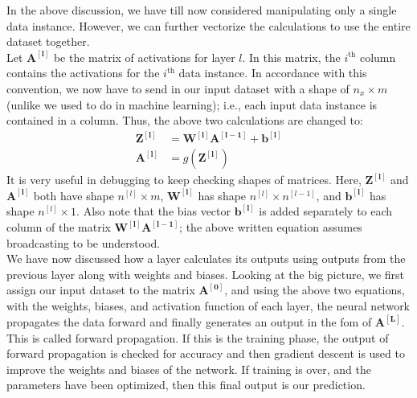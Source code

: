 \documentclass[a4paper, 12pt]{article}
\begin{document}
In the above discussion, we have till now considered manipulating only a single data instance. However, we can further vectorize the calculations to use the entire dataset together. \\
\break
Let $\bm{A^{\left[l\right]}}$ be the matrix of activations for layer $l$. In this matrix, the $i^{\text{th}}$ column contains the activations for the $i^{\text{th}}$ data instance. In accordance with this convention, we now have to send in our input dataset with a shape of $n_x \times m$ (unlike we used to do in machine learning); i.e., each input data instance is contained in a column. Thus, the above two calculations are changed to:
\begin{align*}
\bm{Z^{\left[l\right]}} &= \bm{W^{\left[l\right]}}\bm{A^{\left[l-1\right]}} + \bm{b^{\left[l\right]}} \\
\bm{A^{\left[l\right]}} &= g\left(\bm{Z^{\left[l\right]}}\right)
\end{align*}
It is very useful in debugging to keep checking shapes of matrices. Here, $\bm{Z^{\left[l\right]}}$ and $\bm{A^{\left[l\right]}}$ both have shape $n^{\left[l\right]} \times m$, $\bm{W^{\left[l\right]}}$ has shape $n^{\left[l\right]} \times n^{\left[l-1\right]}$, and $\bm{b^{\left[l\right]}}$ has shape $n^{\left[l\right]} \times 1$. Also note that the bias vector $\bm{b^{\left[l\right]}}$ is added separately to each column of the matrix $\bm{W^{\left[l\right]}}\bm{A^{\left[l-1\right]}}$; the above written equation assumes broadcasting to be understood. \\
\break
We have now discussed how a layer calculates its outputs using outputs from the previous layer along with weights and biases. Looking at the big picture, we first assign our input dataset to the matrix $\bm{A^{\left[0\right]}}$, and using the above two equations, with the weights, biases, and activation function of each layer, the neural network propagates the data forward and finally generates an output in the fom of $\bm{A^{\left[L\right]}}$. This is called forward propagation. If this is the training phase, the output of forward propagation is checked for accuracy and then gradient descent is used to improve the weights and biases of the network. If training is over, and the parameters have been optimized, then this final output is our prediction.
\end{document}
